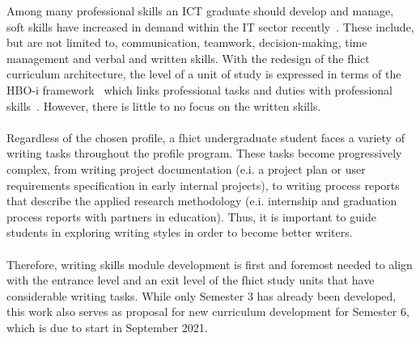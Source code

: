 Among many professional skills an ICT graduate should develop and manage, soft skills have increased in demand within the IT sector recently~\cite{europeanFoundationalICTBOK2015}. These include, but are not limited to, communication, teamwork, decision-making, time management and verbal and written skills.
With the redesign of the \acrshort{fhict} curriculum architecture, the level of a unit of study is expressed in terms of the HBO-i framework~\cite{hboi} which links professional tasks and duties with professional skills~\cite{FHICTNewCurriculum}. However, there is little to no focus on the written skills.
\\\\
Regardless of the chosen profile, a \acrshort{fhict} undergraduate student faces a variety of writing tasks throughout the profile program. 
These tasks become progressively complex, from writing project documentation (e.i. a project plan or user requirements specification in early internal projects), to writing process reports that describe the applied research methodology (e.i. internship and graduation process reports with partners in education). 
Thus, it is important to guide students in exploring writing styles in order to become better writers.
\\\\
Therefore, writing skills module development is first and foremost needed to align with the entrance level and an exit level of the \acrshort{fhict} study units that have considerable writing tasks. While only Semester 3 has already been developed, this work also serves as proposal for new curriculum development for Semester 6, which is due to start in September 2021.


